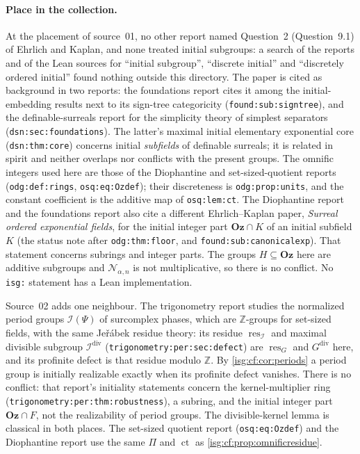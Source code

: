 \documentclass[11pt]{article}
\theoremstyle{definition}
\theoremstyle{remark}
\newcommand{\Oz}{\ensuremath{\mathbf{Oz}}}
\newcommand{\Z}{\mathbb{Z}}
\newcommand{\Rect}{\mathcal{N}_{\alpha,n}}
\newcommand{\ct}{\operatorname{ct}}
\newcommand{\res}{\operatorname{res}}
\newcommand{\dv}{\mathrm{div}}
\newcommand{\replabel}[1]{\nolinkurl{#1}}
\begin{document}
\paragraph{Place in the collection.} At the placement of source~01, no
other report named Question~2 (Question~9.1) of Ehrlich and Kaplan, and
none treated initial subgroups: a search of the reports and of the Lean sources for
``initial subgroup'', ``discrete initial'' and ``discretely ordered
initial'' found nothing outside this directory. The paper \cite{EK} is
cited as background in two reports: the foundations report cites it among
the initial-embedding results next to its sign-tree categoricity
(\replabel{found:sub:signtree}), and the definable-surreals report for
the simplicity theory of simplest separators
(\replabel{dsn:sec:foundations}). The latter's maximal initial elementary
exponential core (\replabel{dsn:thm:core}) concerns initial
\emph{subfields} of definable surreals; it is related in spirit and
neither overlaps nor conflicts with the present groups. The omnific
integers used here are those of the Diophantine and set-sized-quotient
reports (\replabel{odg:def:rings}, \replabel{osq:eq:Ozdef}); their
discreteness is \replabel{odg:prop:units}, and the constant coefficient
is the additive map of \replabel{osq:lem:ct}. The Diophantine report and
the foundations report also cite a different Ehrlich--Kaplan paper,
\emph{Surreal ordered exponential fields}, for the initial integer part
$\Oz\cap K$ of an initial subfield $K$ (the status note after
\replabel{odg:thm:floor}, and \replabel{found:sub:canonicalexp}). That
statement concerns subrings and integer parts. The groups $H\subseteq\Oz$
here are additive subgroups and $\Rect$ is not multiplicative, so there is
no conflict. No \texttt{isg:} statement has a Lean implementation.

Source~02 adds one neighbour. The trigonometry report studies the
normalized period groups $\mathcal I(\Psi)$ of surcomplex phases, which
are $\Z$-groups for set-sized fields, with the same Je\v r\'abek residue
theory: its residue $\res_{\mathcal I}$ and maximal divisible subgroup
$\mathcal I^{\mathrm{div}}$ (\replabel{trigonometry:per:sec:defect}) are
$\res_G$ and $G^{\dv}$ here, and its profinite defect is that residue
modulo $\Z$. By \cref{isg:cf:cor:periods} a period group is initially
realizable exactly when its profinite defect vanishes. There is no
conflict: that report's initiality statements concern the kernel-multiplier
ring (\replabel{trigonometry:per:thm:robustness}), a subring, and the
initial integer part $\Oz\cap F$, not the realizability of period groups.
The divisible-kernel lemma is classical in both places. The set-sized
quotient report (\replabel{osq:eq:Ozdef}) and the Diophantine report use
the same $\Pi$ and $\ct$ as \cref{isg:cf:prop:omnificresidue}.
\end{document}
